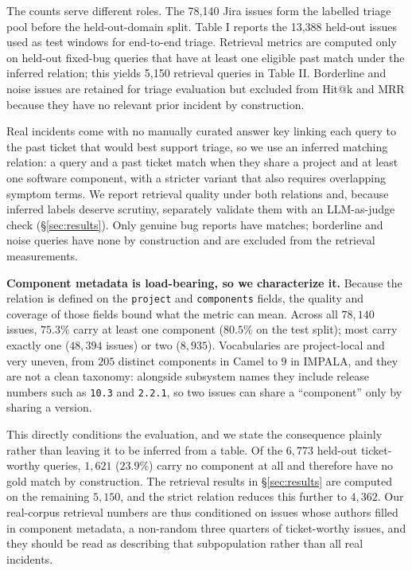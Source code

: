 The counts serve different roles. The 78,140 Jira issues form the labelled triage pool before the held-out-domain split. Table I reports the 13,388 held-out issues used as test windows for end-to-end triage. Retrieval metrics are computed only on held-out fixed-bug queries that have at least one eligible past match under the inferred relation; this yields 5,150 retrieval queries in Table II. Borderline and noise issues are retained for triage evaluation but excluded from Hit@k and MRR because they have no relevant prior incident by construction.

Real incidents come with no manually curated answer key linking each query to the past ticket that would best support triage, so we use an inferred matching relation: a query and a past ticket match when they share a project and at least one software component, with a stricter variant that also requires overlapping symptom terms. We report retrieval quality under both relations and, because inferred labels deserve scrutiny, separately validate them with an LLM-as-judge check (\S\ref{sec:results}). Only genuine bug reports have matches; borderline and
noise queries have none by construction and are excluded from the retrieval
measurements.

\smallskip
\noindent\textbf{Component metadata is load-bearing, so we characterize it.}
Because the relation is defined on the \texttt{project} and \texttt{components}
fields, the quality and coverage of those fields bound what the metric can mean.
Across all $78{,}140$ issues, $75.3\%$ carry at least one component ($80.5\%$ on
the test split); most carry exactly one ($48{,}394$ issues) or two ($8{,}935$).
Vocabularies are project-local and very uneven, from $205$ distinct components in
Camel to $9$ in IMPALA, and they are not a clean taxonomy: alongside subsystem
names they include release numbers such as \texttt{10.3} and \texttt{2.2.1}, so
two issues can share a ``component'' only by sharing a version.

This directly conditions the evaluation, and we state the consequence plainly
rather than leaving it to be inferred from a table. Of the $6{,}773$ held-out
ticket-worthy queries, $1{,}621$ ($23.9\%$) carry no component at all and
therefore have no gold match by construction. The retrieval results in
\S\ref{sec:results} are computed on the remaining $5{,}150$, and the strict
relation reduces this further to $4{,}362$. Our real-corpus retrieval numbers are
thus conditioned on issues whose authors filled in component metadata, a
non-random three quarters of ticket-worthy issues, and they should be read as
describing that subpopulation rather than all real incidents.
